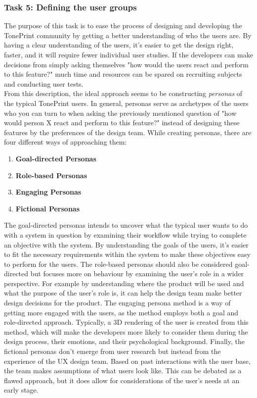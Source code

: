 \subsubsection{Task 5: Defining the user groups}
\label{Task5}
The purpose of this task is to ease the process of designing and developing the TonePrint community by getting a better understanding of who the users are. By having a clear understanding of the users, it's easier to get the design right, faster, and it will require fewer individual user studies. If the developers can make decisions from simply asking themselves "how would the users react and perform to this feature?" much time and resources can be spared on recruiting subjects and conducting user tests.\\

\noindent
From this description, the ideal approach seems to be constructing \textit{personas} of the typical TonePrint users. In general, personas serve as archetypes of the users who you can turn to when asking the previously mentioned question of "how would person X react and perform to this feature?" instead of designing these features by the preferences of the design team. While creating personas, there are four different ways of approaching them:
%
\begin{enumerate}
    \item \textbf{Goal-directed Personas}
    \item \textbf{Role-based Personas}
    \item \textbf{Engaging Personas}
    \item \textbf{Fictional Personas}
\end{enumerate}
%
\noindent
The goal-directed personas intends to uncover what the typical user wants to do with a system in question by examining their workflow while trying to complete an objective with the system. By understanding the goals of the users, it's easier to fit the necessary requirements within the system to make these objectives easy to perform for the users. The role-based personas should also be considered goal-directed but focuses more on behaviour by examining the user's role in a wider perspective. For example by understanding where the product will be used and what the purpose of the user's role is, it can help the design team make better design decisions for the product. The engaging persona method is a way of getting more engaged with the users, as the method employs both a goal and role-directed approach. Typically, a 3D rendering of the user is created from this method, which will make the developers more likely to consider them during the design process, their emotions, and their psychological background. Finally, the fictional personas don't emerge from user research but instead from the experience of the UX design team. Based on past interactions with the user base, the team makes assumptions of what users look like. This can be debated as a flawed approach, but it does allow for considerations of the user's needs at an early stage.\\


